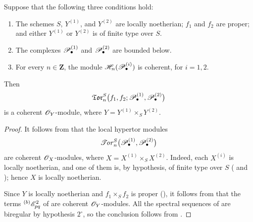 \begin{proposition}[6.7.9]
\label{III.6.7.9}
Suppose that the following three conditions hold:
\begin{enumerate}
  \item[{$1^\circ$}]
    The schemes $S$, $Y^{(1)}$, and $Y^{(2)}$ are locally
    noetherian; $f_1$ and $f_2$ are proper; and either
    $Y^{(1)}$ or $Y^{(2)}$ is of finite type over $S$.
  \item[{$2^\circ$}]
    The complexes $\mathscr{P}_\bullet^{(1)}$ and
    $\mathscr{P}_\bullet^{(2)}$ are bounded below.
  \item[{$3^\circ$}]
    For every $n\in\mathbf Z$, the module
    $\mathscr{H}_n(\mathscr{P}_\bullet^{(i)})$ is coherent, for $i=1,2$.
\end{enumerate}
Then
\[
  \mathfrak{Tor}_n^S
  \bigl(
    f_1,f_2;
    \mathscr{P}_\bullet^{(1)},\mathscr{P}_\bullet^{(2)}
  \bigr)
\]
is a coherent $\mathscr{O}_Y$-module, where
$Y=Y^{(1)}\times_SY^{(2)}$.
\end{proposition}

\begin{proof}
It follows from  that the local hypertor modules
\[
  \mathscr{T}\!\mathit{or}_n^S
  \bigl(
    \mathscr{P}_\bullet^{(1)},\mathscr{P}_\bullet^{(2)}
  \bigr)
\]
are coherent $\mathscr{O}_X$-modules, where
$X=X^{(1)}\times_SX^{(2)}$.  Indeed, each $X^{(i)}$ is locally
noetherian, and one of them is, by hypothesis, of finite type over
    $S$ ( and ); hence $X$ is
locally noetherian.

Since $Y$ is locally noetherian and
$f_1\times_Sf_2$ is proper (), it follows from
 that the terms ${}^{(b)}\mathscr{E}_{pq}^2$ of
 are coherent $\mathscr{O}_Y$-modules.  All the spectral
sequences of  are biregular by hypothesis
$2^\circ$, so the conclusion follows from
.
\end{proof}

